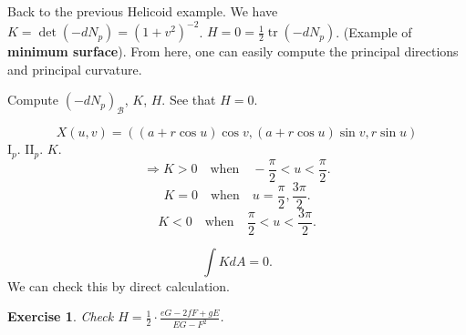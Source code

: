 \documentclass{article}
\newtheorem*{exercise}{Exercise}
\begin{document}
\begin{example}
Back to the previous Helicoid example.
We have $K = \det(-dN_p) = (1+v^2)^{-2}$.
$H = 0 = \frac{1}{2} \operatorname{tr}(-dN_p)$. (Example of \textbf{minimum surface}).
From here, one can easily compute the principal directions and principal curvature.
\end{example}

\begin{example}
Compute $(-dN_p)_{\mathcal{B}}$, $K$, $H$. See that $H=0$.
\end{example}

\begin{example}[Torus]
$$ X(u, v) = ((a + r \cos u) \cos v, (a + r \cos u) \sin v, r \sin u) $$
$\mathrm{I}_p$.
$\mathrm{II}_p$.
$K$.
$$ \Rightarrow K > 0 \quad \text{when} \quad -\frac{\pi}{2} < u < \frac{\pi}{2}. $$
$$ K = 0 \quad \text{when} \quad u = \frac{\pi}{2}, \frac{3\pi}{2}. $$
$$ K < 0 \quad \text{when} \quad \frac{\pi}{2} < u < \frac{3\pi}{2}. $$
\end{example}

\begin{remark}
$$ \int K dA = 0. $$
We can check this by direct calculation.
\end{remark}

\begin{exercise}
Check $H = \frac{1}{2} \cdot \frac{e G - 2 f F + g E}{E G - F^2}$.
\end{exercise}
\end{document}
